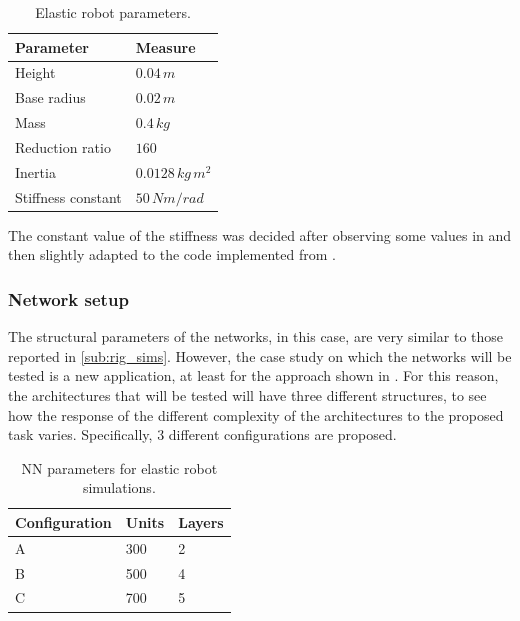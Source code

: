 \documentclass[a4paper]{article}
\begin{document}
\begin{table}
\centering
\caption{Elastic robot parameters.}
\begin{tabular}{P{4.5cm}P{2.5cm}} 
\hline\hline
 \textbf{Parameter} & \textbf{Measure} \\ 
\hline
 Height & $0.04\, m$\\ 
\hline
 Base radius & $0.02\, m$\\ 
\hline
 Mass & $0.4\, kg$\\ 
\hline
 Reduction ratio & $160$\\
\hline
 Inertia & $0.0128\, kg\,m^2$\\
\hline
 Stiffness constant & $50\, Nm/rad$\\
\hline\hline
\end{tabular}
\end{table}

The constant value of the stiffness was decided after observing some values in \cite{giusti} and then slightly adapted to the code implemented from \cite{lnncranmer}.

\subsubsection{Network setup}
\label{subsubsec:nn_elastic}
The structural parameters of the networks, in this case, are very similar to those reported in \ref{sub:rig_sims}. However, the case study on which the networks will be tested is a new application, at least for the approach shown in \cite{lnncranmer}. For this reason, the architectures that will be tested will have three different structures, to see how the response of the different complexity of the architectures to the proposed task varies. Specifically, 3 different configurations are proposed.

\begin{table}
    \centering
    \caption{NN parameters for elastic robot simulations.}
    \begin{tabular}{P{2.5cm}P{2.5cm}P{2.5cm}} 
    \hline\hline
    \textbf{Configuration} & \textbf{Units} & \textbf{Layers} \\ 
    \hline
     A & 300 & 2\\
    \hline
     B & 500 & 4\\
     \hline
     C & 700 & 5\\
    \hline\hline
    \end{tabular}
    \label{tab:elastic_networks}    
\end{table}
\end{document}
